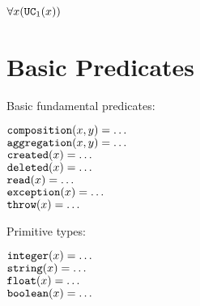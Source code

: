 \documentclass{article}
\begin{document}
    \begin{maths}
    $\forall x(\mbox{\texttt{UC}}_1(x))$ \\
    \end{maths}
    
\newpage
\section{Basic Predicates}

    Basic fundamental predicates:

    \begin{maths}
    $\mbox{\texttt{composition}}(x, y) = \dots$ \\
    $\mbox{\texttt{aggregation}}(x, y) = \dots$ \\
    $\mbox{\texttt{created}}(x) = \dots$ \\
    $\mbox{\texttt{deleted}}(x) = \dots$ \\
    $\mbox{\texttt{read}}(x) = \dots$ \\
    $\mbox{\texttt{exception}}(x) = \dots$ \\
    $\mbox{\texttt{throw}}(x) = \dots$ \\
    \end{maths}

    Primitive types:

    \begin{maths}
    $\mbox{\texttt{integer}}(x) = \dots$ \\
    $\mbox{\texttt{string}}(x) = \dots$ \\
    $\mbox{\texttt{float}}(x) = \dots$ \\
    $\mbox{\texttt{boolean}}(x) = \dots$ \\
    \end{maths}
\end{document}
